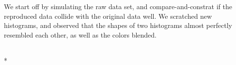\documentclass[letterpaper,10pt,english]{/Users/edwsurewin/anaconda/lib/python2.7/site-packages/sphinx/texinputs/sphinxhowto}
\def\smaller{\fontsize{9.5pt}{9.5pt}\selectfont}
\begin{document}
We start off by simulating the raw data set, and compare-and-constrat if
the reproduced data collide with the original data well. We scratched
new histograms, and observed that the shapes of two histograms almost
perfectly resembled each other, as well as the colors blended.

\iffalse


    
        \vspace{6pt}
        \makebox[0.1\linewidth]{\smaller\hfill\tt\color{nbframe-in-prompt}In\hspace{4pt}{[}44{]}:\hspace{4pt}}\\*
        \vspace{-2.65\baselineskip}
\end{document}

